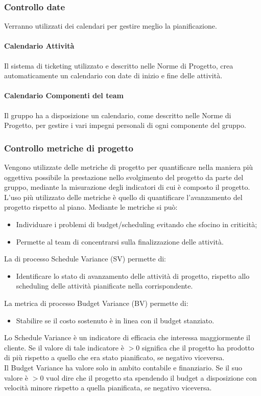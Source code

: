 \subsubsection{Controllo date}
Verranno utilizzati dei calendari per gestire meglio la pianificazione.
\paragraph{Calendario Attività}
Il sistema di ticketing utilizzato e descritto nelle Norme di Progetto, crea automaticamente un calendario con date di inizio e fine delle attività.
\paragraph{Calendario Componenti del team}
Il gruppo ha a disposizione un calendario, come descritto nelle Norme di Progetto, per gestire i vari impegni personali di ogni componente del gruppo.
\subsubsection{Controllo metriche di progetto}
Vengono utilizzate delle metriche di progetto per quantificare nella maniera più oggettiva possibile la prestazione nello svolgimento del progetto da parte del gruppo, mediante la misurazione degli indicatori di cui è composto il progetto. L'uso più utilizzato delle metriche è quello di quantificare l'avanzamento del progetto rispetto al piano. Mediante le metriche si può:
\begin{itemize}
\item Individuare i problemi di budget/scheduling evitando che sfocino in criticità;
\item Permette al team di concentrarsi sulla finalizzazione delle attività.
\end{itemize}
La  di processo Schedule Variance (SV) permette di:
\begin{itemize}
\item Identificare lo stato di avanzamento delle attività di progetto,  rispetto allo scheduling delle attività pianificate nella  corrispondente.
\end{itemize}
La metrica di processo Budget Variance (BV) permette di:
\begin{itemize}
\item Stabilire se il costo sostenuto è in linea con il budget stanziato.
\end{itemize}
Lo Schedule Variance è un indicatore di efficacia che interessa maggiormente il cliente. Se il valore di tale indicatore è $>{0}$ significa che il progetto ha prodotto di più rispetto a quello che era stato pianificato, se negativo viceversa.\\
Il Budget Variance ha valore solo in ambito contabile e finanziario. Se il suo valore è $>{0}$ vuol dire che il progetto sta spendendo il budget a disposizione con velocità minore rispetto a quella pianificata, se negativo viceversa.

